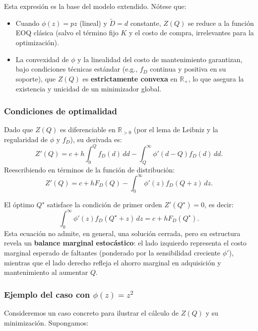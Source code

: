 \documentclass[
  spanish,
  us-letterpaper,
]{scrreprt}
\providecommand{\tightlist}{%
  \setlength{\itemsep}{0pt}\setlength{\parskip}{0pt}}
\numberwithin{equation}{section}
\begin{document}
Esta expresión es la base del modelo extendido. Nótese que:

\begin{itemize}
\tightlist
\item
  Cuando \(\phi(z) = p z\) (lineal) y \(\tilde{D} = d\) constante,
  \(Z(Q)\) se reduce a la función EOQ clásica (salvo el término fijo
  \(K\) y el costo de compra, irrelevantes para la optimización).
\item
  La convexidad de \(\phi\) y la linealidad del costo de mantenimiento
  garantizan, bajo condiciones técnicas estándar (e.g., \(f_D\) continua
  y positiva en su soporte), que \(Z(Q)\) es \textbf{estrictamente
  convexa} en \(\mathbb{R}_{+}\), lo que asegura la existencia y
  unicidad de un minimizador global.
\end{itemize}

\subsubsection{Condiciones de
optimalidad}\label{condiciones-de-optimalidad}

Dado que \(Z(Q)\) es diferenciable en \(\mathbb{R}_{>0}\) (por el lema
de Leibniz y la regularidad de \(\phi\) y \(f_D\)), su derivada es: \[
Z'(Q) = c + h \int_0^Q f_D(d) \, dd - \int_Q^\infty \phi'(d - Q) f_D(d) \, dd.
\] Reescribiendo en términos de la función de distribución: \[
Z'(Q) = c + h F_D(Q) - \int_0^\infty \phi'(z) f_D(Q + z) \, dz.
\]

El óptimo \(Q^\star\) satisface la condición de primer orden
\(Z'(Q^\star) = 0\), es decir: \[
\int_0^\infty \phi'(z) f_D(Q^\star + z) \, dz = c + h F_D(Q^\star).
\] Esta ecuación no admite, en general, una solución cerrada, pero su
estructura revela un \textbf{balance marginal estocástico}: el lado
izquierdo representa el costo marginal esperado de faltantes (ponderado
por la sensibilidad creciente \(\phi'\)), mientras que el lado derecho
refleja el ahorro marginal en adquisición y mantenimiento al aumentar
\(Q\).

\subsubsection{\texorpdfstring{Ejemplo del caso con
\(\phi(z) = z^2\)}{Ejemplo del caso con \textbackslash phi(z) = z\^{}2}}\label{ejemplo-del-caso-con-phiz-z2}

Consideremos un caso concreto para ilustrar el cálculo de \(Z(Q)\) y su
minimización. Supongamos:
\end{document}

